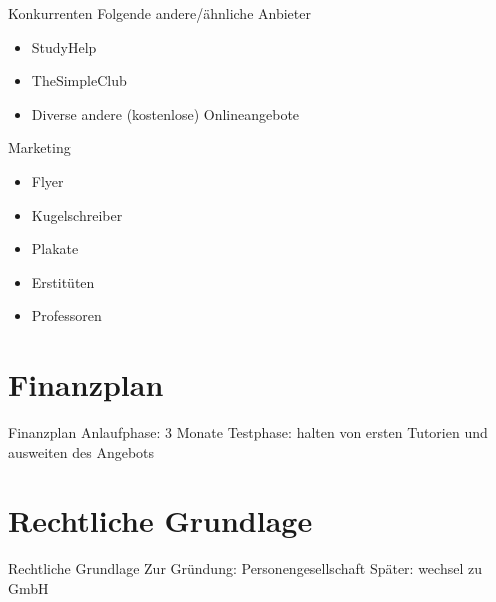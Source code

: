 \begin{frame}[c]{Konkurrenten}
    \Large
    Folgende andere/ähnliche Anbieter
    \pause
    \begin{itemize}[<+->]
    \item StudyHelp
    \item TheSimpleClub
    \item Diverse andere (kostenlose) Onlineangebote
    \end{itemize}
\end{frame}

\begin{frame}[c]{Marketing}
    \begin{itemize}[<+(1)->]
        \item Flyer
        \item Kugelschreiber
        \item Plakate
        \item Erstitüten
        \item Professoren
    \end{itemize}
\end{frame}


\section{Finanzplan}

\begin{frame}[c]{Finanzplan}
    \Large
    Anlaufphase: 3 Monate
    \pause
    \newline
    Testphase: halten von ersten Tutorien und ausweiten des Angebots
\end{frame}




\section{Rechtliche Grundlage}

\begin{frame}[c]{Rechtliche Grundlage}
    \Large
    \pause
    Zur Gründung: Personengesellschaft
    \newline
    \newline
    \pause
    Später: wechsel zu GmbH
\end{frame}




